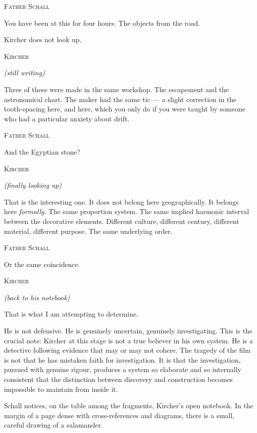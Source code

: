 \documentclass[12pt, a4paper, twoside]{memoir}
\theoremstyle{definition}
\theoremstyle{remark}
\newenvironment{action}{%
  \vspace{4pt}%
  \noindent\begin{minipage}{\linewidth}%
  \setlength{\parindent}{0pt}%
  \itshape\color{kircherink}%
}{%
  \end{minipage}\vspace{6pt}%
}
\newenvironment{dialogue}[1]{%
  \vspace{6pt}%
  \noindent\hspace{24mm}%
  \begin{minipage}{0.6\linewidth}%
  \begin{center}%
  {\small\textsc{#1}}%
  \end{center}%
  \vspace{2pt}%
}{%
  \end{minipage}\vspace{6pt}%
}
\newcommand{\paren}[1]{%
  \begin{center}%
  \small\itshape\color{plaguegrey}(#1)%
  \end{center}%
}
\begin{document}
\begin{dialogue}{Father Schall}
You have been at this for four hours. The objects from the road.
\end{dialogue}

\begin{action}
Kircher does not look up.
\end{action}

\begin{dialogue}{Kircher}
\paren{still writing}
Three of these were made in the same workshop. The escapement and the astronomical chart. The maker had the same tic --- a slight correction in the tooth-spacing here, and here, which you only do if you were taught by someone who had a particular anxiety about drift.
\end{dialogue}

\begin{dialogue}{Father Schall}
And the Egyptian stone?
\end{dialogue}

\begin{dialogue}{Kircher}
\paren{finally looking up}
That is the interesting one. It does not belong here geographically. It belongs here \textit{formally}. The same proportion system. The same implied harmonic interval between the decorative elements. Different culture, different century, different material, different purpose. The same underlying order.
\end{dialogue}

\begin{dialogue}{Father Schall}
Or the same coincidence.
\end{dialogue}

\begin{dialogue}{Kircher}
\paren{back to his notebook}
That is what I am attempting to determine.
\end{dialogue}

\begin{action}
He is not defensive. He is genuinely uncertain, genuinely investigating. This is the crucial note: Kircher at this stage is not a true believer in his own system. He is a detective following evidence that may or may not cohere. The tragedy of the film is not that he has mistaken faith for investigation. It is that the investigation, pursued with genuine rigour, produces a system so elaborate and so internally consistent that the distinction between discovery and construction becomes impossible to maintain from inside it.

Schall notices, on the table among the fragments, Kircher's open notebook. In the margin of a page dense with cross-references and diagrams, there is a small, careful drawing of a salamander.
\end{action}
\end{document}
